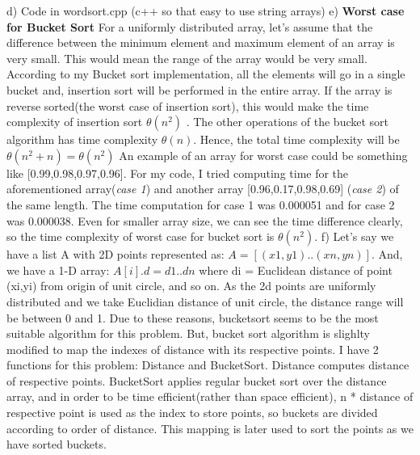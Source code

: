 \documentclass[a4paper,12pt]{article}
\begin{document}
{{\newline \newline  
d) Code in wordsort.cpp (c++ so that easy to use string arrays) \newline
\newline 
e) \textbf{Worst case for Bucket Sort}\newline
For a uniformly distributed array, let's assume that the difference between the minimum element and maximum element of an array is very small. This would mean the range of the array would be very small. According to my Bucket sort implementation, all the elements will go in a single bucket and, insertion sort will be performed in the entire array. If the array is reverse sorted(the worst case of insertion sort), this would make the time complexity of insertion sort $\theta(n^2)$ . The other operations of the bucket sort algorithm has time complexity $\theta(n)$. Hence, the total time complexity will be $\theta(n^2 + n) = \theta(n^2)$\newpage
An example of an array for worst case could be something like [0.99,0.98,0.97,0.96]. For my code, I tried computing time for the aforementioned array(\textit{case 1}) and another array [0.96,0.17,0.98,0.69] (\textit{case 2}) of the same length. The time computation for case 1 was 0.000051 and for case 2 was 0.000038. Even for smaller array size, we can see the time difference clearly, so the time complexity of worst case for bucket sort is $\theta(n^2).$ \newline \newline
f) Let's say we have a list A with 2D points represented as: \newline
\newline     $ A = [(x1,y1)..(xn,yn)] $. \newline \newline
And, we have a 1-D array: \newline
 $ A[i].d = {d1..dn} $ where di = Euclidean distance of point (xi,yi) from origin of unit circle, and so on. \newline 
\newline As the 2d points are uniformly distributed and we take Euclidian distance of unit circle, the distance range will be between 0 and 1. Due to these reasons, bucketsort seems to be the most suitable algorithm for this problem. But, bucket sort algorithm is slighlty modified to map the indexes of distance with its respective points. \newline \newline
I have 2 functions for this problem: Distance and BucketSort. Distance computes distance of respective points. BucketSort applies regular bucket sort over the distance array, and in order to be time efficient(rather than space efficient), n * distance of respective point is used as the index to store points, so buckets are divided according to order of distance. This mapping is later used to sort the points as we have sorted buckets. \newline
}}
\end{document}
